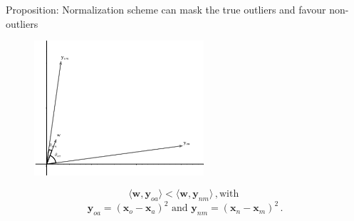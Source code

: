 \documentclass{beamer}
\begin{document}
    \begin{frame}{Proposition: Normalization scheme can mask the true outliers and favour non-outliers}
    \begin{figure}[!t]
	\centering
	\includegraphics[clip=true, height=5cm]{Effect_of_w2.pdf}%
\end{figure}
$$ \langle \bm{w}, \bm{y}_{oa} \rangle  < \langle \bm{w} , \bm{y}_{nm} \rangle \, , \text{with} \, \, $$ 
$$ \bm{y}_{oa}  = \left(\bm{x}_o - \bm{x}_a \right)^2 \,  \, \text{and} \, \,  \bm{y}_{nm}  = \left( \bm{x}_n - \bm{x}_m \right)^2\, . $$
 \end{frame}
\end{document}
